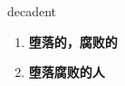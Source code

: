 
\begin{frame}
{\huge decadent}
\begin{center}
\begin{enumerate}\Large
  \item \textbf{堕落的，腐败的}
  \item \textbf{堕落腐败的人}
\end{enumerate}
\end{center}
\end{frame}
